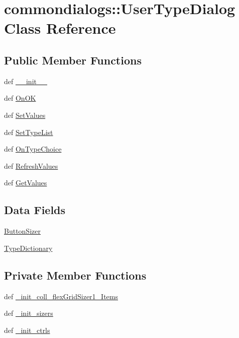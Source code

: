 \hypertarget{classcommondialogs_1_1UserTypeDialog}{
\section{commondialogs::User\-Type\-Dialog Class Reference}
\label{classcommondialogs_1_1UserTypeDialog}
}
\subsection*{Public Member Functions}
\begin{CompactItemize}
\item 
def \hyperlink{classcommondialogs_1_1UserTypeDialog_409b6ac806b2ae0e2ac4c4c4aa6baeb5}{\_\-\_\-init\_\-\_\-}
\item 
def \hyperlink{classcommondialogs_1_1UserTypeDialog_3af71ea699d83da41fee2a2fbf1f55e3}{On\-OK}
\item 
def \hyperlink{classcommondialogs_1_1UserTypeDialog_45bfdc62e0cdb882229682f2cfbe5c08}{Set\-Values}
\item 
def \hyperlink{classcommondialogs_1_1UserTypeDialog_4e5316d45310d70691958ec898a8427c}{Set\-Type\-List}
\item 
def \hyperlink{classcommondialogs_1_1UserTypeDialog_3e986bfc827c25d7786f4d4262ee329b}{On\-Type\-Choice}
\item 
def \hyperlink{classcommondialogs_1_1UserTypeDialog_28ae4b33e1b5f98fcc80f57f421bdf67}{Refresh\-Values}
\item 
def \hyperlink{classcommondialogs_1_1UserTypeDialog_fb21ee3e7916e8de7756b0e87cc70e90}{Get\-Values}
\end{CompactItemize}
\subsection*{Data Fields}
\begin{CompactItemize}
\item 
\hyperlink{classcommondialogs_1_1UserTypeDialog_7e3b701c164d3048295b9bfadcceff93}{Button\-Sizer}
\item 
\hyperlink{classcommondialogs_1_1UserTypeDialog_952db9d303d08119ef6a5f275abad765}{Type\-Dictionary}
\end{CompactItemize}
\subsection*{Private Member Functions}
\begin{CompactItemize}
\item 
def \hyperlink{classcommondialogs_1_1UserTypeDialog_8ac2aa09f370cda00dcc3a5535230a65}{\_\-init\_\-coll\_\-flex\-Grid\-Sizer1\_\-Items}
\item 
def \hyperlink{classcommondialogs_1_1UserTypeDialog_030a0508da4e397f69bfd5824987df70}{\_\-init\_\-sizers}
\item 
def \hyperlink{classcommondialogs_1_1UserTypeDialog_6a633899d2349b962f87b05b542a74d1}{\_\-init\_\-ctrls}
\end{CompactItemize}


